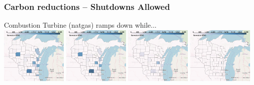 \documentclass[xcolor=dvipsnames]{beamer}
\begin{document}
\begin{frame}
  \frametitle{Carbon reductions -- Shutdowns Allowed}
  Combustion Turbine (natgas) ramps down while... \\
  \includegraphics[width=0.24\textwidth]{includes/no_leakage_shutdowns_CT_r0.png}
  \includegraphics[width=0.24\textwidth]{includes/no_leakage_shutdowns_CT_r2.png}
  \includegraphics[width=0.24\textwidth]{includes/no_leakage_shutdowns_CT_r3.png}
  \includegraphics[width=0.24\textwidth]{includes/no_leakage_shutdowns_CT_r4.png}


\end{frame}
\end{document}
